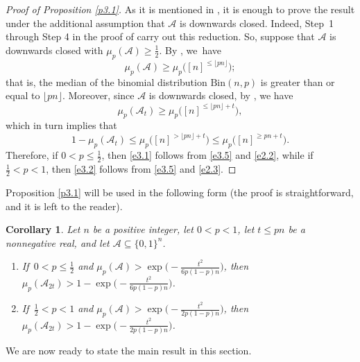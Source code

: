 \documentclass[10pt]{amsart}
\newtheorem{cor}[thm]{Corollary}
\theoremstyle{remark}
\newcommand{\meg}{\geqslant}
\newcommand{\mik}{\leqslant}
\newcommand{\Acal}{\mathcal{A}}
\newcommand{\pmeasure}[1]{\ensuremath{\mu_{p}\left(#1\right)}}
\begin{document}
\begin{proof}[Proof of Proposition \emph{\ref{p3.1}}]
As it is mentioned in \cite{BHT06}, it is enough to prove the result under the additional assumption that
$\Acal$ is downwards closed. Indeed, Step~1 through Step 4 in the proof
of \cite[Theorem 7]{Ta89} carry out this reduction. So, suppose that $\Acal$ is downwards closed
with $\pmeasure{\Acal}\meg \frac12$. By \cite[Theorem 3.2 and Corollary 3.1]{JS68},
we~have
\begin{equation} \label{e3.3}
\pmeasure{\Acal}\meg \mu_p\big([n]^{\mik \lfloor pn \rfloor}\big);
\end{equation}
that is, the median of the binomial distribution $\mathrm{Bin}(n,p)$ is greater than or equal to $\lfloor pn \rfloor$.
Moreover, since $\Acal$ is downwards closed, by \cite[Corollary 5]{BL91}, we have
\begin{equation} \label{e3.4}
\pmeasure{\Acal_t}\meg \mu_p\big([n]^{\mik \lfloor pn \rfloor+t}\big),
\end{equation}
which in turn implies that
\begin{equation} \label{e3.5}
1-\pmeasure{\Acal_t}\mik
\mu_p\big([n]^{>\lfloor pn\rfloor +t}\big)\mik \mu_p\big([n]^{\meg pn +t}\big).
\end{equation}
Therefore, if $0<p\mik \frac12$, then \eqref{e3.1} follows from \eqref{e3.5} and \eqref{e2.2},
while if $\frac12< p<1$, then \eqref{e3.2} follows from \eqref{e3.5} and \eqref{e2.3}.
\end{proof}
Proposition \ref{p3.1} will be used in the following form (the proof is straightforward, and it is left
to the reader).
\begin{cor} \label{c3.2}
Let $n$ be a positive integer, let $0<p<1$, let $t\mik pn$ be a nonnegative real, and let
$\Acal\subseteq \{0,1\}^n$.
\begin{enumerate}
\item[(i)] If\, $0<p\mik \frac12$ and $\pmeasure{\Acal}>\exp\big(-\frac{t^2}{6p(1-p)n}\big)$,
then $\pmeasure{\Acal_{2t}}>1-\exp\big(-\frac{t^2}{6p(1-p)n}\big)$.
\item[(ii)] If\, $\frac12<p<1$ and $\pmeasure{\Acal}>\exp\big(-\frac{t^2}{2p(1-p)n}\big)$,
then $\pmeasure{\Acal_{2t}}>1-\exp\big(-\frac{t^2}{2p(1-p)n}\big)$.
\end{enumerate}
\end{cor}
We are now ready to state the main result in this section.
\end{document}

